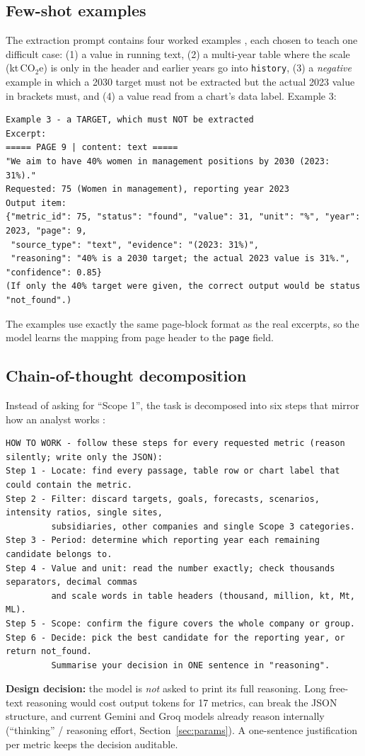 \documentclass[11pt,a4paper]{article}
\newcommand{\code}[1]{\texttt{\small #1}}
\begin{document}
\subsection{Few-shot examples}
The extraction prompt contains four worked examples \cite{fewshot}, each chosen to teach one difficult case:
(1) a value in running text, (2) a multi-year table where the scale (kt\,CO$_2$e) is only in the header and
earlier years go into \code{history}, (3) a \emph{negative} example in which a 2030 target must not be
extracted but the actual 2023 value in brackets must, and (4) a value read from a chart's data label.
Example 3:
\begin{lstlisting}[style=prompt]
Example 3 - a TARGET, which must NOT be extracted
Excerpt:
===== PAGE 9 | content: text =====
"We aim to have 40% women in management positions by 2030 (2023: 31%)."
Requested: 75 (Women in management), reporting year 2023
Output item:
{"metric_id": 75, "status": "found", "value": 31, "unit": "%", "year": 2023, "page": 9,
 "source_type": "text", "evidence": "(2023: 31%)",
 "reasoning": "40% is a 2030 target; the actual 2023 value is 31%.", "confidence": 0.85}
(If only the 40% target were given, the correct output would be status "not_found".)
\end{lstlisting}
The examples use exactly the same page-block format as the real excerpts, so the model learns the mapping
from page header to the \code{page} field.

\subsection{Chain-of-thought decomposition}
Instead of asking for ``Scope 1'', the task is decomposed into six steps that mirror how an analyst works
\cite{cot}:
\begin{lstlisting}[style=prompt]
HOW TO WORK - follow these steps for every requested metric (reason silently; write only the JSON):
Step 1 - Locate: find every passage, table row or chart label that could contain the metric.
Step 2 - Filter: discard targets, goals, forecasts, scenarios, intensity ratios, single sites,
         subsidiaries, other companies and single Scope 3 categories.
Step 3 - Period: determine which reporting year each remaining candidate belongs to.
Step 4 - Value and unit: read the number exactly; check thousands separators, decimal commas
         and scale words in table headers (thousand, million, kt, Mt, ML).
Step 5 - Scope: confirm the figure covers the whole company or group.
Step 6 - Decide: pick the best candidate for the reporting year, or return not_found.
         Summarise your decision in ONE sentence in "reasoning".
\end{lstlisting}
\textbf{Design decision:} the model is \emph{not} asked to print its full reasoning. Long free-text reasoning
would cost output tokens for 17 metrics, can break the JSON structure, and current Gemini and Groq models
already reason internally (``thinking'' / reasoning effort, Section~\ref{sec:params}). A one-sentence
justification per metric keeps the decision auditable.
\end{document}
